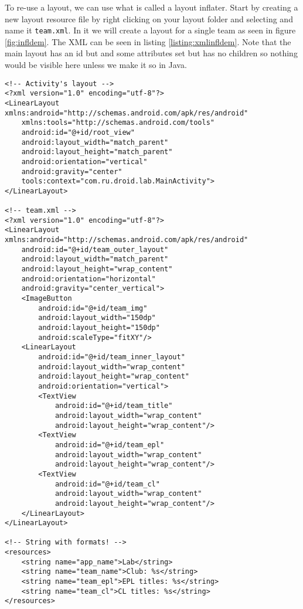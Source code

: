 To re-use a layout, we can use what is called a layout inflater. Start by creating a new layout resource file by right clicking on your layout folder and selecting  and name it \texttt{team.xml}. In it we will create a layout for a single team as seen in figure \ref{fig:infldem}. The XML can be seen in listing \ref{listing:xmlinfldem}. Note that the main layout has an id but and some attributes set but has no children so nothing would be visible here unless we make it so in Java.

\begin{lstlisting}[style=A_XML, caption={XML for inflater demo}, label={listing:xmlinfldem}]
<!-- Activity's layout -->
<?xml version="1.0" encoding="utf-8"?>
<LinearLayout xmlns:android="http://schemas.android.com/apk/res/android"
    xmlns:tools="http://schemas.android.com/tools"
    android:id="@+id/root_view"
    android:layout_width="match_parent"
    android:layout_height="match_parent"
    android:orientation="vertical"
    android:gravity="center"
    tools:context="com.ru.droid.lab.MainActivity">
</LinearLayout>

<!-- team.xml -->
<?xml version="1.0" encoding="utf-8"?>
<LinearLayout xmlns:android="http://schemas.android.com/apk/res/android"
    android:id="@+id/team_outer_layout"
    android:layout_width="match_parent"
    android:layout_height="wrap_content"
    android:orientation="horizontal"
    android:gravity="center_vertical">
    <ImageButton
        android:id="@+id/team_img"
        android:layout_width="150dp"
        android:layout_height="150dp"
        android:scaleType="fitXY"/>
    <LinearLayout
        android:id="@+id/team_inner_layout"
        android:layout_width="wrap_content"
        android:layout_height="wrap_content"
        android:orientation="vertical">
        <TextView
            android:id="@+id/team_title"
            android:layout_width="wrap_content"
            android:layout_height="wrap_content"/>
        <TextView
            android:id="@+id/team_epl"
            android:layout_width="wrap_content"
            android:layout_height="wrap_content"/>
        <TextView
            android:id="@+id/team_cl"
            android:layout_width="wrap_content"
            android:layout_height="wrap_content"/>
    </LinearLayout>
</LinearLayout>

<!-- String with formats! -->
<resources>
    <string name="app_name">Lab</string>
    <string name="team_name">Club: %s</string>
    <string name="team_epl">EPL titles: %s</string>
    <string name="team_cl">CL titles: %s</string>
</resources>
\end{lstlisting}


